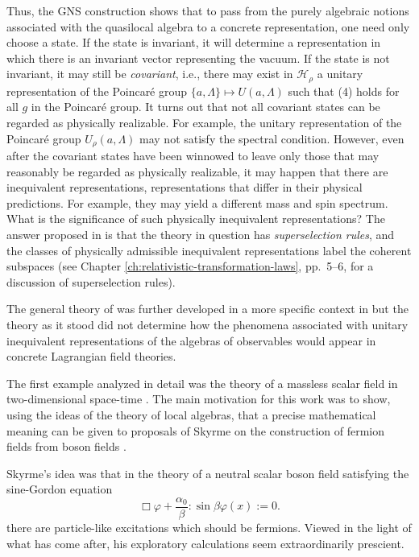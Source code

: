 Thus, the GNS construction shows that to pass from the purely algebraic
notions associated with the quasilocal algebra to a concrete representation,
one need only choose a state.  If the state is invariant, it will determine a
representation in which there is an invariant vector representing the
vacuum.  If the state is not invariant, it may still be \emph{covariant},
i.e., there may exist in $\mathcal H_\rho$ a unitary representation of the
Poincar\'e group $\{a,\Lambda\}\mapsto U(a,\Lambda)$ such that (4) holds for
all $g$ in the Poincar\'e group.  It turns out that not all covariant states
can be regarded as physically realizable.  For example, the unitary
representation of the Poincar\'e group $U_\rho(a,\Lambda)$ may not satisfy
the spectral condition.  However, even after the covariant states have been
winnowed to leave only those that may reasonably be regarded as physically
realizable, it may happen that there are inequivalent representations,
representations that differ in their physical predictions.  For example,
they may yield a different mass and spin spectrum.  What is the significance
of such physically inequivalent representations?  The answer proposed in
\cite{pct-app-65} is that the theory in question has \emph{superselection rules}, and the
classes of physically admissible inequivalent representations label the
coherent subspaces (see Chapter \ref{ch:relativistic-transformation-laws}, pp.~5--6, for a discussion of
superselection rules).

The general theory of \cite{pct-app-65} was further developed in a more specific context
in \cite{pct-app-69,pct-app-70,pct-app-71} but the theory as it stood did not determine how the phenomena
associated with unitary inequivalent representations of the algebras of
observables would appear in concrete Lagrangian field theories.

The first example analyzed in detail was the theory of a massless scalar
field in two-dimensional space-time \cite{pct-app-72}.  The main motivation for this work
was to show, using the ideas of the theory of local algebras, that a precise
mathematical meaning can be given to proposals of Skyrme on the construction
of fermion fields from boson fields \cite{pct-app-73}.

Skyrme's idea was that in the theory of a neutral scalar boson field
satisfying the sine-Gordon equation
\begin{equation*}
  \Box\varphi+\frac{\alpha_0}{\beta}:\!\sin\beta\varphi(x)\!:=0.
\end{equation*}
there are particle-like excitations which should be fermions.  Viewed in the
light of what has come after, his exploratory calculations seem
extraordinarily prescient.

